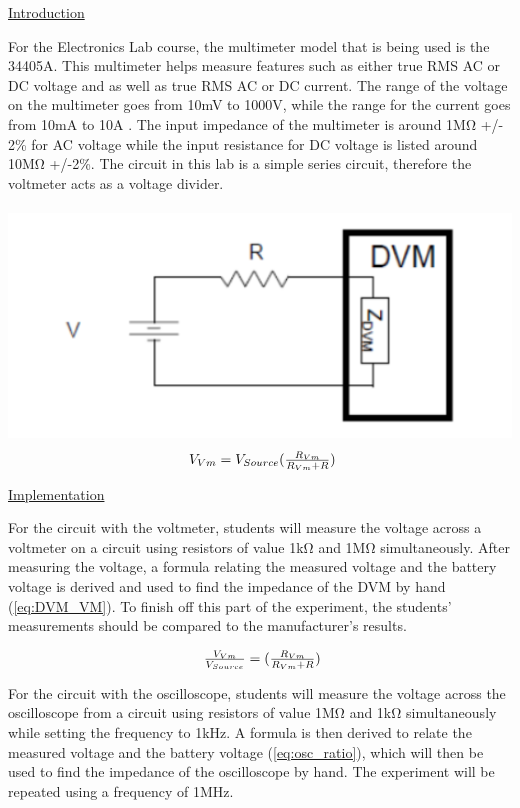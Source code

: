 \documentclass[a4paper,10pt]{article}
\begin{document}
\underline{Introduction}

For the Electronics Lab course, the multimeter model that is being used is the 34405A. This multimeter helps measure features such as either true RMS AC or DC voltage and as well as true RMS AC or DC current. The range of the voltage on the multimeter goes from 10mV to 1000V, while the range for the current goes from 10mA to 10A \cite{34405A:3}. The input impedance of the multimeter is around 1M\si{\ohm} +/- 2\% for AC voltage while the input resistance for DC voltage is listed around 10M\si{\ohm} +/-2\%\cite{34405A:6}. The circuit in this lab is a simple series circuit, therefore the voltmeter acts as a voltage divider.\\
\\

\includegraphics{voltmeter.png}
\label{Voltmeter_Pic}
\begin{equation}
\label{eq:volt_div}
\centerline{ $ V_{Vm} = V_{Source}(\frac{R_{Vm}}{R_{Vm} + R}) $} 
\end{equation}


\underline{Implementation}

For the circuit with the voltmeter, students will measure the  voltage across a voltmeter on a circuit using resistors of value 1kΩ and 1MΩ simultaneously. After measuring the voltage, a formula relating the measured voltage and the battery voltage is derived and used to find the impedance of the DVM by hand (\ref{eq:DVM_VM}). To finish off this part of the experiment, the students’ measurements should be compared to the manufacturer's results. 

\begin{equation}
\label{eq:DVM_VM}
\centerline{ $ \frac{V_{Vm}}{V_{Source}} = (\frac{R_{Vm}}{R_{Vm} + R}) $} 
\end{equation}


For the circuit with the oscilloscope, students will measure the voltage across the oscilloscope from a circuit using resistors of value 1MΩ and 1kΩ simultaneously while setting the frequency to 1kHz. A formula is then derived to relate the measured voltage and the battery voltage (\ref{eq:osc_ratio}), which will then be used to find the impedance of the oscilloscope by hand. The experiment will be repeated using a frequency of 1MHz.
\end{document}

